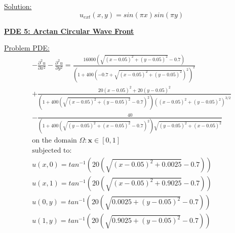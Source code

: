\documentclass[.\jobname.tex]{subfiles}
\begin{document}
\underline{Solution:}
\begin{equation}
\label{eq:sol4}
u_{ext}(x,y) = sin(\pi x)sin(\pi y)
\end{equation}



\begin{figure}[H]
	\centering
	\noindent{}
	\label{fig:sol_plot_4}
\end{figure}




\newpage







\underline{\textbf{PDE 5: Arctan Circular Wave Front}} 

\underline{Problem PDE:}
\begin{equation}
\label{eq:pde5}
\begin{split}
-\frac{\partial^2 u}{\partial x^2} - \frac{\partial^2 u}{\partial y^2} = \frac{16000(\sqrt{(x - 0.05)^2 + (y - 0.05)^2} -0.7)}{(1 + 400 (-0.7 + \sqrt{(x - 0.05)^2 + (y - 0.05)^2})^2)^2} \\
+ \frac{20 (x - 0.05)^2 + 20 (y - 0.05)^2}{(1 + 400 (\sqrt{(x - 0.05)^2 + (y - 0.05)^2} -0.7)^2) ((x - 0.05)^2 + (y - 0.05)^2)^{3/2}} \\
- \frac{40}{(1 + 400 (\sqrt{(y - 0.05)^2 + (x - 0.05)^2} -0.7)^2) \sqrt{(y - 0.05)^2 + (x - 0.05)^2}} \\
\text{on the domain } \Omega: \mathbf{x} \in [0,1] \\
\text{subjected to: } \\
u(x,0) = tan^{-1}\left(20 \left(\sqrt{(x-0.05)^2 + 0.0025} -0.7\right)\right) \\
u(x,1) = tan^{-1}\left(20 \left(\sqrt{(x-0.05)^2 + 0.9025} -0.7\right)\right) \\
u(0,y) = tan^{-1}\left(20 \left(\sqrt{0.0025 + (y-0.05)^2} -0.7\right)\right) \\
u(1,y) = tan^{-1}\left(20 \left(\sqrt{0.9025 + (y-0.05)^2} -0.7\right)\right) \\
\end{split}
\end{equation}
\end{document}
